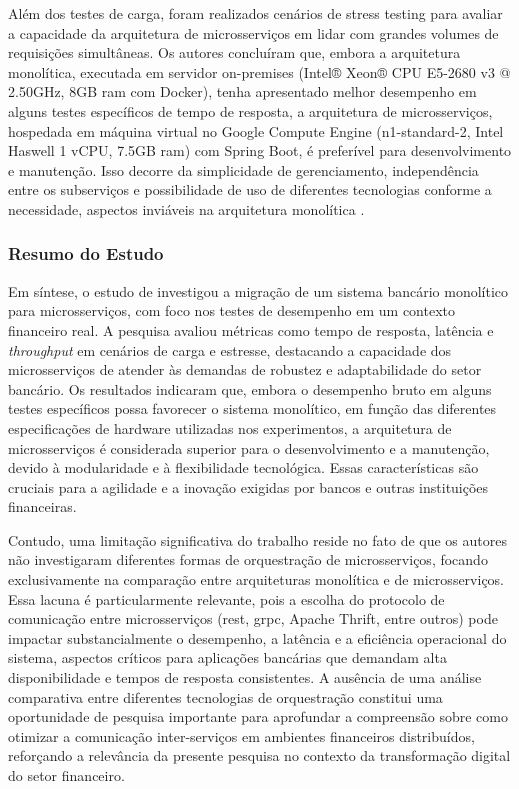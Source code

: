 Além dos testes de carga, foram realizados cenários de stress testing para avaliar a capacidade da arquitetura de microsserviços em lidar com grandes volumes de requisições simultâneas. Os autores concluíram que, embora a arquitetura monolítica, executada em servidor on-premises (Intel® Xeon® CPU E5-2680 v3 @ 2.50GHz, 8GB \acrshort{ram} com Docker), tenha apresentado melhor desempenho em alguns testes específicos de tempo de resposta, a arquitetura de microsserviços, hospedada em máquina virtual no Google Compute Engine (n1-standard-2, Intel Haswell 1 vCPU, 7.5GB \acrshort{ram}) com Spring Boot, é preferível para desenvolvimento e manutenção. Isso decorre da simplicidade de gerenciamento, independência entre os subserviços e possibilidade de uso de diferentes tecnologias conforme a necessidade, aspectos inviáveis na arquitetura monolítica \cite{rademacher_modeling_2020}.

 \subsubsection{Resumo do Estudo}

Em síntese, o estudo de \textcite{maulana_design_2022} investigou a migração de um sistema bancário monolítico para microsserviços, com foco nos testes de desempenho em um contexto financeiro real. A pesquisa avaliou métricas como tempo de resposta, latência e \textit{throughput} em cenários de carga e estresse, destacando a capacidade dos microsserviços de atender às demandas de robustez e adaptabilidade do setor bancário. Os resultados indicaram que, embora o desempenho bruto em alguns testes específicos possa favorecer o sistema monolítico, em função das diferentes especificações de hardware utilizadas nos experimentos, a arquitetura de microsserviços é considerada superior para o desenvolvimento e a manutenção, devido à modularidade e à flexibilidade tecnológica. Essas características são cruciais para a agilidade e a inovação exigidas por bancos e outras instituições financeiras.

Contudo, uma limitação significativa do trabalho reside no fato de que os autores não investigaram diferentes formas de orquestração de microsserviços, focando exclusivamente na comparação entre arquiteturas monolítica e de microsserviços. Essa lacuna é particularmente relevante, pois a escolha do protocolo de comunicação entre microsserviços (\gls{rest}, \gls{grpc}, Apache Thrift, entre outros) pode impactar substancialmente o desempenho, a latência e a eficiência operacional do sistema, aspectos críticos para aplicações bancárias que demandam alta disponibilidade e tempos de resposta consistentes. A ausência de uma análise comparativa entre diferentes tecnologias de orquestração constitui uma oportunidade de pesquisa importante para aprofundar a compreensão sobre como otimizar a comunicação inter-serviços em ambientes financeiros distribuídos, reforçando a relevância da presente pesquisa no contexto da transformação digital do setor financeiro.
